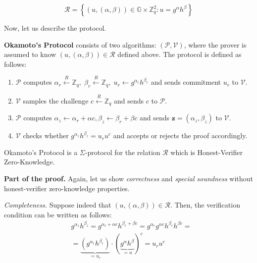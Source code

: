 \documentclass[../lecture-notes.tex]{subfiles}
\begin{document}
\begin{equation*}
    \mathcal{R} = \left\{ (u,(\alpha,\beta)) \in \mathbb{G} \times \mathbb{Z}_q^2: u = g^{\alpha}h^{\beta} \right\}
\end{equation*}

\vspace{-1mm}

Now, let us describe the protocol.

\vspace{-1mm}

\begin{definition}
    \textbf{Okamoto's Protocol} consists of two algorithms: $(\mathcal{P}, \mathcal{V})$, where the prover is assumed to know $(u,(\alpha,\beta)) \in \mathcal{R}$ defined above. The protocol is defined as follows:
    \begin{enumerate}
        \item $\mathcal{P}$ computes $\alpha_r \xleftarrow{R} \mathbb{Z}_q, \; \beta_r \xleftarrow{R} \mathbb{Z}_q, \; u_r \gets g^{\alpha_r}h^{\beta_r}$ and sends commitment $u_r$ to $\mathcal{V}$.
        \item $\mathcal{V}$ samples the challenge $c \xleftarrow{R} \mathbb{Z}_q$ and sends $c$ to $\mathcal{P}$.
        \item $\mathcal{P}$ computes $\alpha_z \gets \alpha_r + \alpha c, \beta_z \gets \beta_r + \beta c$ and sends $\mathbf{z} = (\alpha_z,\beta_z)$ to $\mathcal{V}$.
        \item $\mathcal{V}$ checks whether $g^{\alpha_z}h^{\beta_z} = u_r u^c$ and accepts or rejects the proof accordingly.
    \end{enumerate}
\end{definition}

\vspace{-4mm}

\begin{theorem}
    Okamoto's Protocol is a $\Sigma$-protocol for the relation $\mathcal{R}$ which is Honest-Verifier Zero-Knowledge.
\end{theorem}

\vspace{-1mm}

\textbf{Part of the proof.} Again, let us show \textit{correctness} and \textit{special soundness} without honest-verifier zero-knowledge properties.

\textit{Completeness.} Suppose indeed that $(u,(\alpha,\beta)) \in \mathcal{R}$. Then, the verification condition can be written as follows:
\begin{equation*}
    \begin{aligned}
        & g^{\alpha_z}h^{\beta_z} = g^{\alpha_r + \alpha c}h^{\beta_r + \beta c} = g^{\alpha_r}g^{\alpha c}h^{\beta_r}h^{\beta c} = \\ 
        & = \underbrace{(g^{\alpha_r}h^{\beta_r})}_{=u_r} \cdot (\underbrace{g^{\alpha}h^{\beta}}_{=u})^c = u_r u^c        
    \end{aligned}
\end{equation*}
\end{document}
